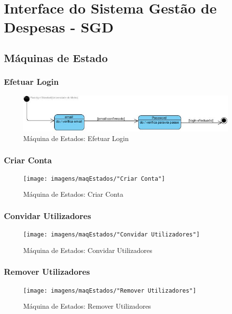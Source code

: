\newpage

\chapter{Interface do Sistema Gestão de Despesas - SGD}
\section{Máquinas de Estado}
\subsection{Efetuar Login}

\begin{figure}[htb!]
	\centering
	\includegraphics[scale=0.7]{imagens/maqEstados/Login}  
	\caption{Máquina de Estados: Efetuar Login}  
\end{figure}


\subsection{Criar Conta}
\begin{figure}[htb!]
	\centering
	\texttt{[image: imagens/maqEstados/"Criar Conta"]}  
	\caption{Máquina de Estados: Criar Conta}  
\end{figure}

\subsection{Convidar Utilizadores}
\begin{figure}[htb!]
	\centering
	\texttt{[image: imagens/maqEstados/"Convidar Utilizadores"]}  
	\caption{Máquina de Estados: Convidar Utilizadores}  
\end{figure}

\subsection{Remover Utilizadores}
\begin{figure}[htb!]
	\centering
	\texttt{[image: imagens/maqEstados/"Remover Utilizadores"]}  
	\caption{Máquina de Estados: Remover Utilizadores}  
\end{figure}

